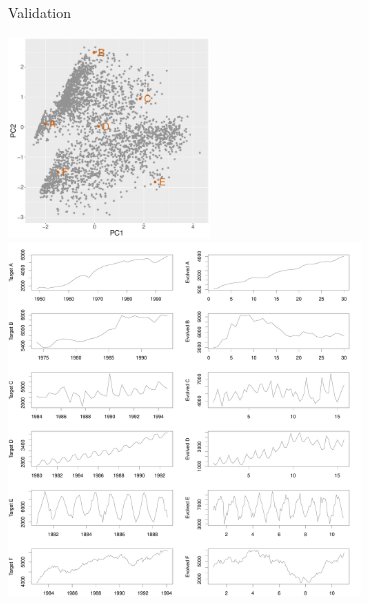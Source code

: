 \documentclass[12pt,ignorenonframetext,compress]{beamer}
\begin{document}
\begin{frame}{Validation}

\includegraphics[width=0.4\textwidth]{figures/TargetedInstancesEgsLocations.pdf}
\includegraphics[width=0.7\textwidth]{figures/EvolvedInstancesEgs.pdf}

\end{frame}
\end{document}
